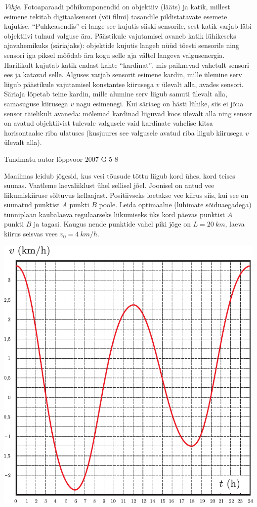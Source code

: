 \documentclass[11pt, twoside]{article}
\begin{document}
{{\emph{Vihje}. 
Fotoaparaadi põhikomponendid on objektiiv (lääts) ja katik, millest
esimene tekitab digitaalsensori (või filmi) tasandile pildistatavate esemete kujutise. \enquote{Puhkeasendis} ei lange see kujutis siiski sensorile, sest katik varjab
läbi objektiivi tulnud valguse ära. Päästikule vajutamisel avaneb katik lühikeseks ajavahemikuks (säriajaks): objektide kujutis langeb nüüd tõesti sensorile
ning sensori iga piksel mõõdab ära kogu selle aja vältel langeva valgusenergia.
Harilikult kujutab katik endast kahte \enquote{kardinat}, mis paiknevad vahetult sensori ees ja katavad selle. Alguses varjab sensorit esimene kardin, mille ülemine
serv liigub päästikule vajutamisel konstantse kiirusega $v$ ülevalt alla, avades
sensori. Säriaja lõpetab teine kardin, mille alumine serv liigub samuti ülevalt
alla, samasuguse kiirusega $v$ nagu esimenegi. Kui säriaeg on hästi lühike, siis
ei jõua sensor täielikult avaneda: mõlemad kardinad liiguvad koos ülevalt alla
ning sensor on avatud objektiivist tulevale valgusele vaid kardinate vahelise
kitsa horisontaalse riba ulatuses (kusjuures see valgusele avatud riba liigub
kiirusega $v$ ülevalt alla).
\fi
}

{Tundmatu autor} %
{lõppvoor} %
{2007} %
{G 5} %
{8} %
{
\ifStatement
Maailmas leidub jõgesid, kus vesi tõusude tõttu liigub kord ühes, kord teises suunas. Vaatleme laevaliiklust ühel sellisel jõel. Joonisel on antud vee liikumiskiiruse sõltuvus kellaajast. Positiivseks loetakse vee kiirus siis, kui see on suunatud punktist $A$ punkti $B$ poole. Leida optimaalne (lühimate sõiduaegadega) tunniplaan kaubalaeva regulaarseks liikumiseks üks kord päevas punktist $A$ punkti $B$ ja tagasi. Kaugus nende punktide vahel piki jõge on $L = \SI{20}{km}$, laeva kiirus seisvas vees $v_0 = \SI{4}{km/h}$.

\begin{center}
	\includegraphics[width=0.7\linewidth]{2007-v3g-05-yl}
\end{center}
\fi
}

}
\end{document}
